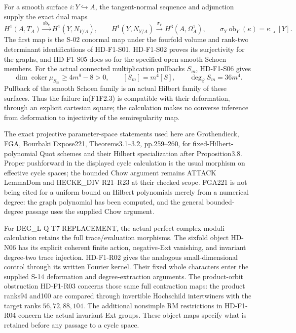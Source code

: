 For a smooth surface $i:Y\hookrightarrow A$, the tangent-normal
sequence and adjunction supply the exact dual maps
\[
 H^1(A,T_A)\xrightarrow{\operatorname{ob}_Y}H^1(Y,N_{Y/A}),
 \qquad
 H^1(Y,N_{Y/A})\xrightarrow{\sigma_Y}H^3(A,\Omega_A^1),
 \qquad
 \sigma_Y\operatorname{ob}_Y(\kappa)=\kappa\lrcorner[Y].
 \tag{F1F2.2}
\]
The first map is the S-02 conormal map under the fourfold volume
and rank-two determinant identifications of HD-F1-S01.
HD-F1-S02 proves its surjectivity for the graphs, and HD-F1-S05
does so for the specified open smooth Schoen members. For the
actual connected multiplication pullbacks $S_m$, HD-F1-S06 gives
\[
 \dim\operatorname{coker}\mu_{S_m}\ge4m^8-8>0,
 \qquad [S_m]=m^4[S],\qquad \deg_\beta S_m=36m^4.
 \tag{F1F2.3}
\]
Pullback of the smooth Schoen family is an actual Hilbert family
of these surfaces. Thus the failure in(F1F2.3) is compatible with
their deformation, through an explicit cartesian square; the
calculation makes no converse inference from deformation to
injectivity of the semiregularity map.

The exact projective parameter-space statements used here are
Grothendieck, FGA, Bourbaki Expose221, Theorems3.1--3.2,
pp.259--260, for fixed-Hilbert-polynomial Quot schemes and their
Hilbert specialization after Proposition3.8. Proper pushforward
in the displayed cycle calculation is the usual morphism on
effective cycle spaces; the bounded Chow argument remains
ATTACK LemmaDom and HECKE\_DIV R21--R23 at their checked scope.
FGA221 is not being cited for a uniform bound on Hilbert
polynomials merely from a numerical degree: the graph polynomial
has been computed, and the general bounded-degree passage uses
the supplied Chow argument.

For DEG\_L Q-T7-REPLACEMENT, the actual perfect-complex moduli
calculation retains the full trace/evaluation morphisms. The
sixfold object HD-N06 has its explicit coherent finite action,
negative-Ext vanishing, and invariant degree-two trace injection.
HD-F1-R02 gives the analogous small-dimensional control through
its written Fourier kernel. Their fixed whole characters enter
the supplied S-14 deformation and degree-extraction arguments.
The product-orbit obstruction HD-F1-R03 concerns those same full
contraction maps: the product ranks94 and100 are compared through
invertible Hochschild intertwiners with the target ranks
$56,72,88,104$. The additional nonsimple RM restrictions in
HD-F1-R04 concern the actual invariant Ext groups. These object
maps specify what is retained before any passage to a cycle space.

